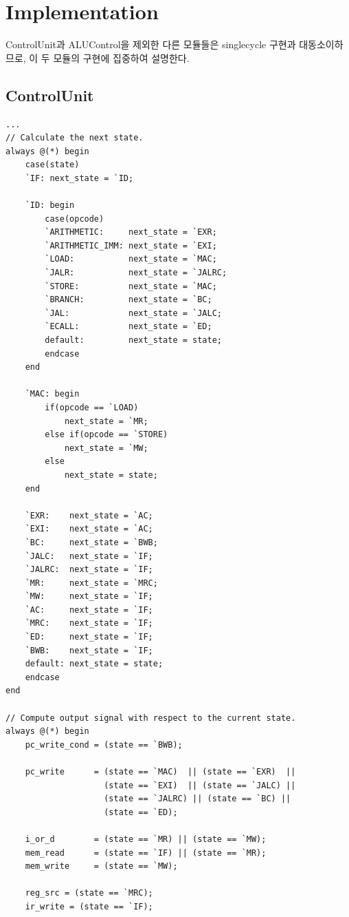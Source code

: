 \documentclass[openright, a4paper]{article}
\newenvironment{longlisting}{\captionsetup{type=listing}}{}
\begin{document}
\section{Implementation}
ControlUnit과 ALUControl을 제외한 다른 모듈들은 singlecycle 구현과
대동소이하므로, 이 두 모듈의 구현에 집중하여 설명한다.

\subsection{ControlUnit}
\begin{longlisting}
    \begin{verbatim}
...
// Calculate the next state.
always @(*) begin
    case(state)
    `IF: next_state = `ID;

    `ID: begin
        case(opcode)
        `ARITHMETIC:     next_state = `EXR;
        `ARITHMETIC_IMM: next_state = `EXI;
        `LOAD:           next_state = `MAC;
        `JALR:           next_state = `JALRC;
        `STORE:          next_state = `MAC;
        `BRANCH:         next_state = `BC;
        `JAL:            next_state = `JALC;
        `ECALL:          next_state = `ED;
        default:         next_state = state;
        endcase
    end

    `MAC: begin
        if(opcode == `LOAD)
            next_state = `MR;
        else if(opcode == `STORE)
            next_state = `MW;
        else
            next_state = state;
    end

    `EXR:    next_state = `AC;
    `EXI:    next_state = `AC;
    `BC:     next_state = `BWB;
    `JALC:   next_state = `IF;
    `JALRC:  next_state = `IF;
    `MR:     next_state = `MRC;
    `MW:     next_state = `IF;
    `AC:     next_state = `IF;
    `MRC:    next_state = `IF;
    `ED:     next_state = `IF;
    `BWB:    next_state = `IF;
    default: next_state = state;
    endcase
end

// Compute output signal with respect to the current state.
always @(*) begin
    pc_write_cond = (state == `BWB);

    pc_write      = (state == `MAC)  || (state == `EXR)  || 
                    (state == `EXI)  || (state == `JALC) || 
                    (state == `JALRC) || (state == `BC) ||
                    (state == `ED);

    i_or_d        = (state == `MR) || (state == `MW);
    mem_read      = (state == `IF) || (state == `MR);
    mem_write     = (state == `MW);

    reg_src = (state == `MRC);
    ir_write = (state == `IF);


\end{verbatim}
\end{longlisting}
\end{document}
